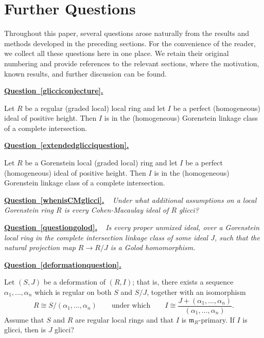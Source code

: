 \documentclass[11pt,letterpaper]{amsart}
\newcommand{\x}{\xrightarrow{}}
\theoremstyle{plain}
\theoremstyle{definition}
\theoremstyle{remark}
\newenvironment{recalledquestion}[1]
{%
  \par\medskip
  \noindent
  \textbf{\hyperref[#1]{Question~\ref*{#1}.}}
  \ \itshape
}
{%
  \par\medskip
}
\begin{document}
\section{Further Questions}
Throughout this paper, several questions arose naturally from the results and methods developed in the preceding sections. For the convenience of the reader, we collect all these questions here in one place. We retain their original numbering and provide references to the relevant sections, where the motivation, known results, and further discussion can be found.  \\

\begin{recalledquestion}{glicciconjecture}
      Let $R$ be a regular (graded local) local ring and let $I$ be a perfect (homogeneous) ideal of positive height. Then $I$ is in the (homogeneous) Gorenstein linkage class of a complete intersection.
\end{recalledquestion}

\begin{recalledquestion}{extendedglicciquestion}
Let $R$ be a Gorenstein local (graded local) ring and let $I$ be a perfect (homogeneous) ideal of positive height. Then $I$ is in the (homogeneous) Gorenstein linkage class of a complete intersection.    
\end{recalledquestion}

\begin{recalledquestion}{whenisCMglicci}Under what additional assumptions on a local Gorenstein
ring $R$ is every Cohen-Macaulay ideal of $R$ glicci?
\end{recalledquestion}

\begin{recalledquestion}{questiongolod}  Is every proper unmixed ideal, over a Gorenstein local ring in the complete intersection linkage class of some ideal $J$, such that the natural projection map $R\x R/J$ is a Golod homomorphism.
    
\end{recalledquestion}

\begin{recalledquestion}{deformationquestion}
     Let $(S,J)$ be a deformation of $(R,I)$; that is, there exists
a sequence $\alpha_1,\ldots,\alpha_n$ which is regular on both $S$ and
$S/J$, together with an isomorphism
\[
R \cong S/(\alpha_1,\ldots,\alpha_n)\qquad\text{under which}\qquad
I \cong
\frac{J+(\alpha_1,\ldots,\alpha_n)}
     {(\alpha_1,\ldots,\alpha_n)}.
\]
Assume that $S$ and $R$ are regular local rings and that $I$ is
$\mathfrak m_R$-primary. If $I$ is glicci, then is $J$ glicci?
\end{recalledquestion}
\end{document}
